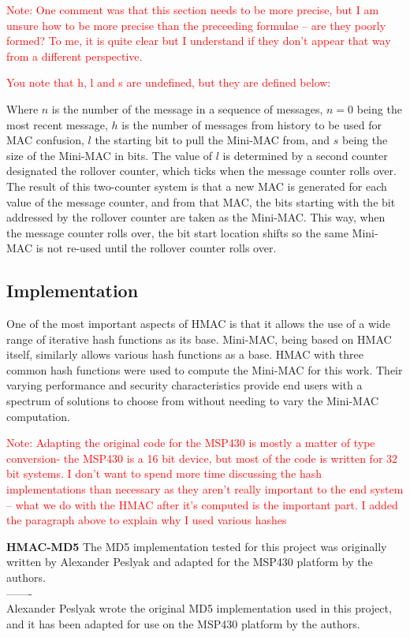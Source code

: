 \textcolor{red}{Note: One comment was that this section needs to be more precise, but I am unsure how to be more precise than the preceeding formulae -- are they poorly formed? To me, it is quite clear but I understand if they don't appear that way from a different perspective.}

\textcolor{red}{You note that h, l and s are undefined, but they are defined below:}

Where $n$ is the number of the message in a sequence of messages, $n=0$ being the most recent message, $h$ is the number of messages from history to be used for MAC confusion, $l$ the starting bit to pull the Mini-MAC from, and $s$ being the size of the Mini-MAC in bits. The value of $l$ is determined by a second counter designated the rollover counter, which ticks when the message counter rolls over. The result of this two-counter system is that a new MAC is generated for each value of the message counter, and from that MAC, the bits starting with the bit addressed by the rollover counter are taken as the Mini-MAC. This way, when the message counter rolls over, the bit start location shifts so the same Mini-MAC is not re-used until the rollover counter rolls over.

\subsection{Implementation}
One of the most important aspects of HMAC is that it allows the use of a wide range of iterative hash functions as its base. Mini-MAC, being based on HMAC itself, similarly allows various hash functions as a base. HMAC with three common hash functions were used to compute the Mini-MAC for this work. Their varying performance and security characteristics provide end users with a spectrum of solutions to choose from without needing to vary the Mini-MAC computation.

\textcolor{red}{Note: Adapting the original code for the MSP430 is mostly a matter of type conversion- the MSP430 is a 16 bit device, but most of the code is written for 32 bit systems. I don't want to spend more time discussing the hash implementations than necessary as they aren't really important to the end system -- what we do with the HMAC after it's computed is the important part. I added the paragraph above to explain why I used various hashes}

\textbf{HMAC-MD5}
The MD5 implementation tested for this project was originally written by Alexander Peslyak \cite{Peslyak} and adapted for the MSP430 platform by the authors. \\-------\\
Alexander Peslyak \cite{Peslyak} wrote the original MD5 implementation used in this project, and it has been adapted for use on the MSP430 platform by the authors. 

